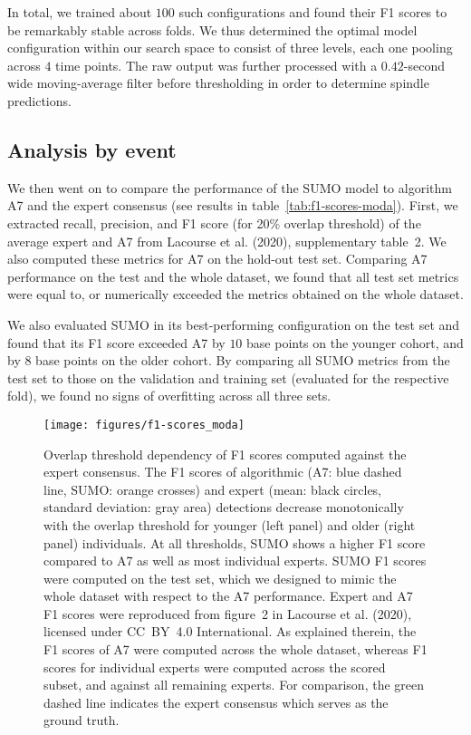 \documentclass[fleqn,twocolumn,10pt]{wlscirep}
\begin{document}
In total, we trained about $100$ such configurations and found their F1 scores
to be remarkably stable across folds.  We thus determined the optimal model
configuration within our search space to consist of three levels, each one
pooling across $4$ time points.
The raw output was further processed with a $0.42$-second wide moving-average
filter before thresholding in order to determine spindle predictions.

\subsection{Analysis by event}

We then went on to compare the performance of the SUMO model to algorithm A7
and the expert consensus (see results in table~\ref{tab:f1-scores-moda}). First,
we extracted recall, precision, and F1 score (for 20\% overlap threshold) of the
average expert and A7 from Lacourse et al. (2020)\cite{Lacourse2020},
supplementary table~2. We also computed these metrics for A7 on the hold-out
test set.
Comparing A7 performance on the test and the whole dataset, we found that all
test set metrics were equal to, or numerically exceeded the metrics obtained on
the whole dataset.

We also evaluated SUMO in its best-performing configuration on the test set
and found that its F1 score exceeded A7 by $10$ base points on the younger cohort,
and by $8$ base points on the older cohort.
By comparing all SUMO metrics from the test set to those on the validation and
training set (evaluated for the respective fold), we found no signs of
overfitting across all three sets.

\begin{figure*}[t]
	\centering
	\texttt{[image: figures/f1-scores\_moda]}
	\caption{
		Overlap threshold dependency of F1 scores computed against the
		expert consensus.
The F1 scores of algorithmic (A7: blue dashed line, SUMO:
		orange crosses) and expert (mean: black circles, standard
		deviation: gray area) detections decrease monotonically with
		the overlap threshold for younger (left panel) and older (right
		panel) individuals.
At all thresholds, SUMO shows a higher F1 score compared
		to A7 as well as most individual experts.
SUMO F1 scores were computed on the test set, which we designed to
		mimic the whole dataset with respect to the A7 performance.  Expert
		and A7 F1 scores were reproduced from figure~2 in Lacourse et al.
		(2020)\cite{Lacourse2020}, licensed under CC~BY~4.0 International\cite{CCby40}.  As explained therein, the F1 scores of A7
		were computed across the whole dataset, whereas F1 scores for
		individual experts were computed across the scored subset, and against
		all remaining experts.  For comparison, the green dashed line indicates
		the expert consensus which serves as the ground truth.
	}
	\label{fig:f1-scores-moda}
\end{figure*}
\end{document}
